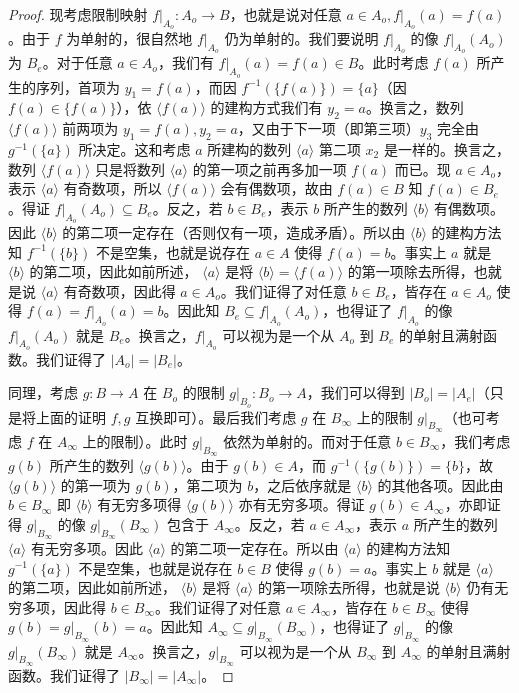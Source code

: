 \begin{proof}
现考虑限制映射 $f|_{A_o} : A_o \to B$，也就是说对任意 $a \in A_o, f|_{A_o}(a) = f(a)$。由于 $f$ 为单射的，很自然地 $f|_{A_o}$ 仍为单射的。我们要说明 $f|_{A_o}$ 的像 $f|_{A_o}(A_o)$ 为 $B_e$。对于任意 $a \in A_o$，我们有 $f|_{A_o}(a) = f(a) \in B$。此时考虑 $f(a)$ 所产生的序列，首项为 $y_1 = f(a)$，而因 $f^{-1}(\{f(a)\}) = \{a\}$（因 $f(a) \in \{f(a)\}$），依 $\langle f(a) \rangle$ 的建构方式我们有 $y_2 = a$。换言之，数列 $\langle f(a) \rangle$ 前两项为 $y_1 = f(a), y_2 = a$，又由于下一项（即第三项）$y_3$ 完全由 $g^{-1}(\{a\})$ 所决定。这和考虑 $a$ 所建构的数列 $\langle a \rangle$ 第二项 $x_2$ 是一样的。换言之，数列 $\langle f(a) \rangle$ 只是将数列 $\langle a \rangle$ 的第一项之前再多加一项 $f(a)$ 而已。现 $a \in A_o$，表示 $\langle a \rangle$ 有奇数项，所以 $\langle f(a) \rangle$ 会有偶数项，故由 $f(a) \in B$ 知 $f(a) \in B_e$。得证 $f|_{A_o}(A_o) \subseteq B_e$。反之，若 $b \in B_e$，表示 $b$ 所产生的数列 $\langle b \rangle$ 有偶数项。因此 $\langle b \rangle$ 的第二项一定存在（否则仅有一项，造成矛盾）。所以由 $\langle b \rangle$ 的建构方法知 $f^{-1}(\{b\})$ 不是空集，也就是说存在 $a \in A$ 使得 $f(a) = b$。事实上 $a$ 就是 $\langle b \rangle$ 的第二项，因此如前所述， $\langle a \rangle$ 是将 $\langle b \rangle = \langle f(a) \rangle$ 的第一项除去所得，也就是说 $\langle a \rangle$ 有奇数项，因此得 $a \in A_o$。我们证得了对任意 $b \in B_e$，皆存在 $a \in A_o$ 使得 $f(a) = f|_{A_o}(a) = b$。因此知 $B_e \subseteq f|_{A_o}(A_o)$，也得证了 $f|_{A_o}$ 的像 $f|_{A_o}(A_o)$ 就是 $B_e$。换言之，$f|_{A_o}$ 可以视为是一个从 $A_o$ 到 $B_e$ 的单射且满射函数。我们证得了 $|A_o| = |B_e|$。

同理，考虑 $g : B \to A$ 在 $B_o$ 的限制 $g|_{B_o} : B_o \to A$，我们可以得到 $|B_o| = |A_e|$（只是将上面的证明 $f, g$ 互换即可）。最后我们考虑 $g$ 在 $B_\infty$ 上的限制 $g|_{B_\infty}$（也可考虑 $f$ 在 $A_\infty$ 上的限制）。此时 $g|_{B_\infty}$ 依然为单射的。而对于任意 $b \in B_\infty$，我们考虑 $g(b)$ 所产生的数列 $\langle g(b) \rangle$。由于 $g(b) \in A$，而 $g^{-1}(\{g(b)\}) = \{b\}$，故 $\langle g(b) \rangle$ 的第一项为 $g(b)$，第二项为 $b$，之后依序就是 $\langle b \rangle$ 的其他各项。因此由 $b \in B_\infty$ 即 $\langle b \rangle$ 有无穷多项得 $\langle g(b) \rangle$ 亦有无穷多项。得证 $g(b) \in A_\infty$，亦即证得 $g|_{B_\infty}$ 的像 $g|_{B_\infty}(B_\infty)$ 包含于 $A_\infty$。反之，若 $a \in A_\infty$，表示 $a$ 所产生的数列 $\langle a \rangle$ 有无穷多项。因此 $\langle a \rangle$ 的第二项一定存在。所以由 $\langle a \rangle$ 的建构方法知 $g^{-1}(\{a\})$ 不是空集，也就是说存在 $b \in B$ 使得 $g(b) = a$。事实上 $b$ 就是 $\langle a \rangle$ 的第二项，因此如前所述， $\langle b \rangle$ 是将 $\langle a \rangle$ 的第一项除去所得，也就是说 $\langle b \rangle$ 仍有无穷多项，因此得 $b \in B_\infty$。我们证得了对任意 $a \in A_\infty$，皆存在 $b \in B_\infty$ 使得 $g(b) = g|_{B_\infty}(b) = a$。因此知 $A_\infty \subseteq g|_{B_\infty}(B_\infty)$，也得证了 $g|_{B_\infty}$ 的像 $g|_{B_\infty}(B_\infty)$ 就是 $A_\infty$。换言之，$g|_{B_\infty}$ 可以视为是一个从 $B_\infty$ 到 $A_\infty$ 的单射且满射函数。我们证得了 $|B_\infty| = |A_\infty|$。


\end{proof}
